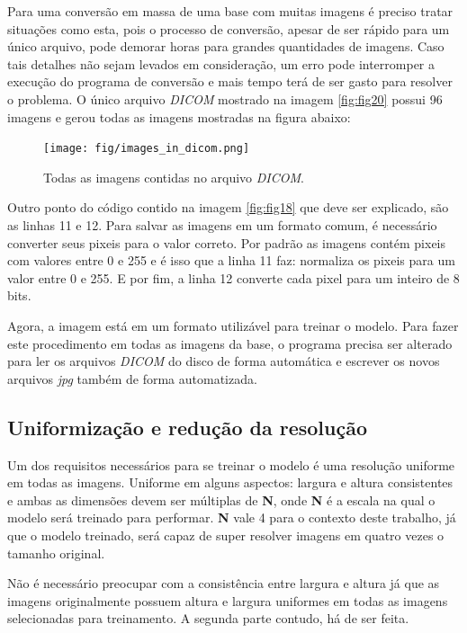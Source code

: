 Para uma conversão em massa de uma base com muitas imagens é preciso tratar situações como esta, pois o processo de conversão, apesar de ser rápido para um único arquivo, pode demorar horas para grandes quantidades de imagens. Caso tais detalhes não sejam levados em consideração, um erro pode interromper a execução do programa de conversão e mais tempo terá de ser gasto para resolver o problema. O único arquivo \textit{DICOM} mostrado na imagem \ref{fig:fig20} possui 96 imagens e gerou todas as imagens mostradas na figura abaixo:

\begin{figure}[H]
    \centering
    \caption{Todas as imagens contidas no arquivo \textit{DICOM}.}
    \texttt{[image: fig/images\_in\_dicom.png]}
    \label{fig:fig21}
\end{figure}

Outro ponto do código contido na imagem \ref{fig:fig18} que deve ser explicado, são as linhas 11 e 12. Para salvar as imagens em um formato comum, é necessário converter seus pixeis para o valor correto. Por padrão as imagens contém pixeis com valores entre 0 e 255 e é isso que a linha 11 faz: normaliza os pixeis para um valor entre 0 e 255. E por fim, a linha 12 converte cada pixel para um inteiro de 8 bits.

Agora, a imagem está em um formato utilizável para treinar o modelo. Para fazer este procedimento em todas as imagens da base, o programa precisa ser alterado para ler os arquivos \textit{DICOM} do disco de forma automática e escrever os novos arquivos \textit{jpg} também de forma automatizada.

\subsection{Uniformização e redução da resolução}
\label{sec:uniformizacao}

Um dos requisitos necessários para se treinar o modelo é uma resolução uniforme em todas as imagens. Uniforme em alguns aspectos: largura e altura consistentes e ambas as dimensões devem ser múltiplas de \textbf{N}, onde \textbf{N} é a escala na qual o modelo será treinado para performar. \textbf{N} vale 4 para o contexto deste trabalho, já que o modelo treinado, será capaz de super resolver imagens em quatro vezes o tamanho original.

Não é necessário preocupar com a consistência entre largura e altura já que as imagens originalmente possuem altura e largura uniformes em todas as imagens selecionadas para treinamento. A segunda parte contudo, há de ser feita.

